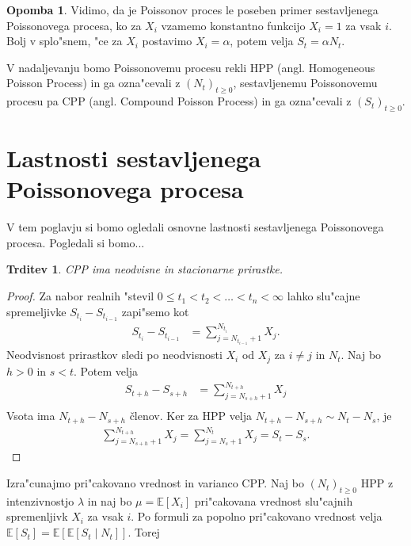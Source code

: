 \documentclass[12pt,a4paper]{amsart}
\theoremstyle{definition} %
\newtheorem{opomba}[definicija]{Opomba}
\theoremstyle{plain} %
\newtheorem{trditev}[definicija]{Trditev}
\newcommand{\E}{\mathbb{E}}
\newcommand{\1}{\mathds{1}}
\begin{document}
    \begin{opomba}
        Vidimo, da je Poissonov proces le poseben primer sestavljenega Poissonovega procesa, ko za
        $X_i$ vzamemo konstantno funkcijo $X_i = 1$ za vsak $i$. Bolj v splo"snem, "ce za $X_i$ 
        postavimo $X_i = \alpha$, potem velja $S_t = \alpha N_t$.
        \label{op:CPPHPPPovezava}
    \end{opomba}

    V nadaljevanju bomo Poissonovemu procesu rekli HPP (angl. Homogeneous Poisson Process) in ga
    ozna"cevali z $(N_t)_{t\geq0}$, sestavljenemu Poissonovemu procesu pa CPP (angl. Compound Poisson 
    Process) in ga ozna"cevali z $(S_t)_{t\geq0}$.

\section{Lastnosti sestavljenega Poissonovega procesa}

    V tem poglavju si bomo ogledali osnovne lastnosti sestavljenega Poissonovega procesa. Pogledali
    si bomo... 
    \begin{trditev}
        CPP ima neodvisne in stacionarne prirastke.
        \label{trd:neodvPrirCPP}
    \end{trditev}

    \begin{proof}
        Za nabor realnih "stevil $0 \leq t_1 < t_2 < \ldots < t_n < \infty$ lahko slu"cajne
        spremeljivke $S_{t_i} - S_{t_{i-1}}$ zapi"semo kot
        \begin{align*}
            S_{t_i} - S_{t_{i-1}} &= \sum_{j=N_{t_{i-1}}+1}^{N_{t_i}} X_j. 
        \end{align*}
        Neodvisnost prirastkov sledi po neodvisnosti $X_i$ od $X_j$ za $i\neq j$ in $N_t$. 
        Naj bo $h > 0$ in $s < t$. Potem velja
        \begin{align*}
            S_{t+h} - S_{s+h} &= \sum_{j=N_{s+h}+1}^{N_{t+h}} X_j \\
        \end{align*}
        Vsota ima $N_{t+h} - N_{s+h}$ členov. Ker za HPP velja 
        $N_{t+h} - N_{s+h} \sim N_t - N_s$, je 
        \begin{align*}
            \sum_{j=N_{s+h}+1}^{N_{t+h}} X_j = \sum_{j=N_{s}+1}^{N_{t}} X_j = S_t - S_s.
        \end{align*}
    \end{proof}

    Izra"cunajmo pri"cakovano vrednost in varianco CPP. Naj bo $(N_t)_{t\geq 0}$ HPP z 
    intenzivnostjo $\lambda$ in naj bo $\mu = \E\left[X_i\right]$ pri"cakovana vrednost 
    slu"cajnih spremenljivk $X_i$ za vsak $i$. Po formuli za popolno pri"cakovano vrednost velja 
    $\E\left[S_t\right] = \E\left[\E\left[S_t\mid N_t\right]\right]$. Torej
\end{document}
